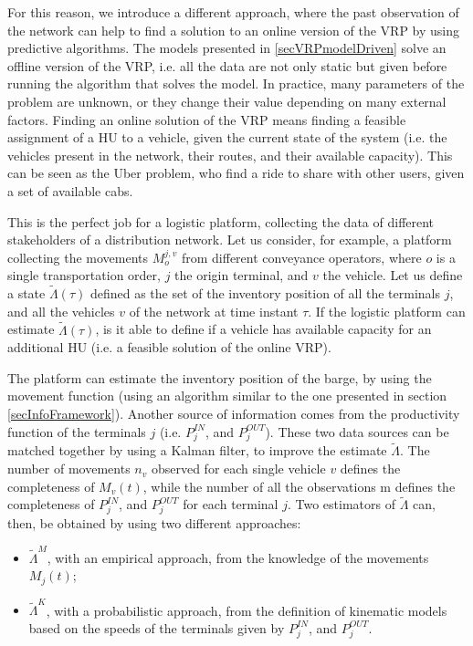 For this reason, we introduce a different approach, where the past observation of the network can help to find a solution to an online version of the VRP by using predictive algorithms. The models presented in \ref{secVRPmodelDriven} solve an offline version of the VRP, i.e. all the data are not only static but given before running the algorithm that solves the model. In practice, many parameters of the problem are unknown, or they change their value depending on many external factors. Finding an online solution of the VRP means finding a feasible assignment of a HU to a vehicle, given the current state of the system (i.e. the vehicles present in the network, their routes, and their available capacity). This can be seen as the Uber problem, who find a ride to share with other users, given a set of available cabs.\par

This is the perfect job for a logistic platform, collecting the data of different stakeholders of a distribution network. Let us consider, for example, a platform collecting the movements $M_o^{j,v}$ from different conveyance operators, where $o$ is a single transportation order, $j$ the origin terminal, and $v$ the vehicle. Let us define a state $\widetilde{\Lambda}(\tau)$ defined as the set of the inventory position of all the terminals $j$, and all the vehicles $v$ of the network at time instant $\tau$. If the logistic platform can estimate $\widetilde{\Lambda}(\tau)$, is it able to define if a vehicle has available capacity for an additional HU (i.e. a feasible solution of the online VRP). \par

The platform can estimate the inventory position of the barge, by using the movement function (using an algorithm similar to the one presented in section \ref{secInfoFramework}). Another source of information comes from the productivity function of the terminals $j$ (i.e. $P_j^{IN}$, and $P_j^{OUT}$). These two data sources can be matched together by using a Kalman filter, to improve the estimate $\widetilde{\Lambda}$. The number of movements $n_v$ observed for each single vehicle $v$ defines the completeness of $M_v(t)$, while the number of all the observations m defines the completeness of $P_j^{IN}$, and $P_j^{OUT}$ for each terminal $j$. Two estimators of $\widetilde{\Lambda}$ can, then, be obtained by using two different approaches:

\begin{itemize}
    \item ${\widetilde{\Lambda}}^M$, with an empirical approach, from the knowledge of the movements $M_j\left(t\right)$;
	\item ${\widetilde{\Lambda}}^K$, with a probabilistic approach, from the definition of kinematic models based on the speeds of the terminals given by $P_j^{IN}$, and $P_j^{OUT}$.

\end{itemize}

